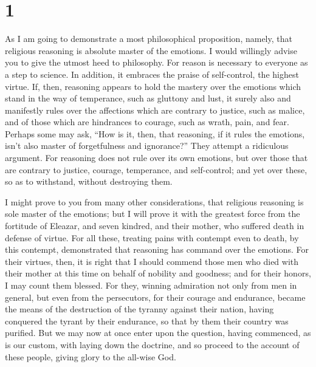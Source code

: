 \hypertarget{section}{%
\section{1}\label{section}}

 As I am going to demonstrate a most philosophical
proposition, namely, that religious reasoning is absolute master of the
emotions. I would willingly advise you to give the utmost heed to
philosophy.  For reason is necessary to everyone as a step
to science. In addition, it embraces the praise of self-control, the
highest virtue.  If, then, reasoning appears to hold the
mastery over the emotions which stand in the way of temperance, such as
gluttony and lust,  it surely also and manifestly rules
over the affections which are contrary to justice, such as malice, and
of those which are hindrances to courage, such as wrath, pain, and fear.
 Perhaps some may ask, ``How is it, then, that reasoning,
if it rules the emotions, isn't also master of forgetfulness and
ignorance?'' They attempt a ridiculous argument.  For
reasoning does not rule over its own emotions, but over those that are
contrary to justice, courage, temperance, and self-control; and yet over
these, so as to withstand, without destroying them.

 I might prove to you from many other considerations, that
religious reasoning is sole master of the emotions;  but I
will prove it with the greatest force from the fortitude of Eleazar, and
seven kindred, and their mother, who suffered death in defense of
virtue.  For all these, treating pains with contempt even
to death, by this contempt, demonstrated that reasoning has command over
the emotions.  For their virtues, then, it is right that
I should commend those men who died with their mother at this time on
behalf of nobility and goodness; and for their honors, I may count them
blessed.  For they, winning admiration not only from men
in general, but even from the persecutors, for their courage and
endurance, became the means of the destruction of the tyranny against
their nation, having conquered the tyrant by their endurance, so that by
them their country was purified.  But we may now at once
enter upon the question, having commenced, as is our custom, with laying
down the doctrine, and so proceed to the account of these people, giving
glory to the all-wise God.

